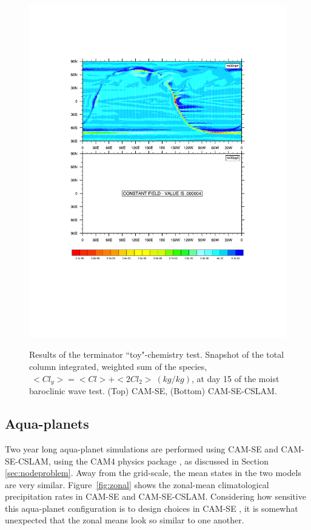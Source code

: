 \documentclass[twocol]{ametsoc}
\begin{document}
\begin{figure}[t]
\begin{center}
\noindent\includegraphics[width=37pc,angle=0]{figs/terminator_iCLy.pdf}\\
\end{center}
\caption{Results of the terminator ``toy"-chemistry test. Snapshot of the total column integrated, weighted sum of the species,$\ <Cl_y> = <Cl> + <2Cl_2>\ \left(kg/kg\right)$, at day 15 of the moist baroclinic wave test. (Top) CAM-SE, (Bottom) CAM-SE-CSLAM.}
\label{fig:term}
\end{figure}

\subsection{{\color{red}Aqua-planets{}}}

{\color{red}Two year long aqua-planet simulations are performed using CAM-SE and CAM-SE-CSLAM, using the CAM4 physics package \citep{CAM4}, as discussed in Section \ref{sec:nodeproblem}. Away from the grid-scale, the mean states in the two models are very similar. Figure~\ref{fig:zonal} shows the zonal-mean climatological precipitation rates in CAM-SE and CAM-SE-CSLAM. Considering how sensitive this aqua-planet configuration is to design choices in CAM-SE \citep{LetAl2018JAMES}, it is somewhat unexpected that the zonal means look so similar to one another.{}} 
\end{document}
